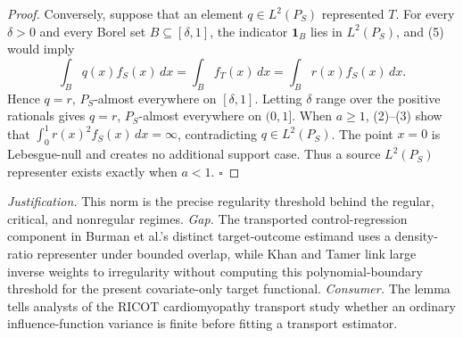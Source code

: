 \documentclass{article}
\begin{document}
\begin{proof}
Conversely, suppose that an element \(q\in L^2(P_S)\) represented \(T\). For every \(\delta>0\) and every Borel set \(B\subseteq[\delta,1]\), the indicator \(\mathbf 1_B\) lies in \(L^2(P_S)\), and (5) would imply
\[
\int_Bq(x)f_S(x)\,dx=\int_Bf_T(x)\,dx
=\int_Br(x)f_S(x)\,dx.
\tag{6}
\]
Hence \(q=r\), \(P_S\)-almost everywhere on \([\delta,1]\). Letting \(\delta\) range over the positive rationals gives \(q=r\), \(P_S\)-almost everywhere on \((0,1]\). When \(a\ge1\), (2)--(3) show that \(\int_0^1r(x)^2f_S(x)\,dx=\infty\), contradicting \(q\in L^2(P_S)\). The point \(x=0\) is Lebesgue-null and creates no additional support case. Thus a source \(L^2(P_S)\) representer exists exactly when \(a<1\). \(\square\)
\end{proof}
\par\smallskip\noindent \textit{Justification.} This norm is the precise regularity threshold behind the regular, critical, and nonregular regimes. \textit{Gap.} The transported control-regression component in Burman et al.'s distinct target-outcome estimand uses a density-ratio representer under bounded overlap, while Khan and Tamer link large inverse weights to irregularity without computing this polynomial-boundary threshold for the present covariate-only target functional. \textit{Consumer.} The lemma tells analysts of the RICOT cardiomyopathy transport study whether an ordinary influence-function variance is finite before fitting a transport estimator.
\end{document}
